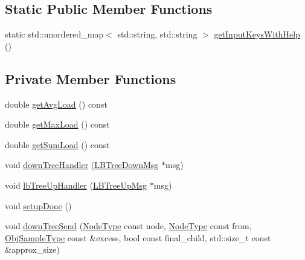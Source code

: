 \subsection*{Static Public Member Functions}
\begin{DoxyCompactItemize}
\item 
static std\+::unordered\+\_\+map$<$ std\+::string, std\+::string $>$ \hyperlink{structvt_1_1vrt_1_1collection_1_1lb_1_1_hierarchical_l_b_a3d0967de5be48bdb9ca86178b6b2a2d1}{get\+Input\+Keys\+With\+Help} ()
\end{DoxyCompactItemize}
\subsection*{Private Member Functions}
\begin{DoxyCompactItemize}
\item 
double \hyperlink{structvt_1_1vrt_1_1collection_1_1lb_1_1_hierarchical_l_b_a2fced8b5bbeeef2c150e66146cc77961}{get\+Avg\+Load} () const
\item 
double \hyperlink{structvt_1_1vrt_1_1collection_1_1lb_1_1_hierarchical_l_b_a32428a4c65c820d846e398270578d986}{get\+Max\+Load} () const
\item 
double \hyperlink{structvt_1_1vrt_1_1collection_1_1lb_1_1_hierarchical_l_b_a4cdebd4215afd2cac890525c7901f4ad}{get\+Sum\+Load} () const
\item 
void \hyperlink{structvt_1_1vrt_1_1collection_1_1lb_1_1_hierarchical_l_b_aa5e027cba0dfc9a1c7bc710e9932647a}{down\+Tree\+Handler} (\hyperlink{structvt_1_1vrt_1_1collection_1_1lb_1_1_l_b_tree_down_msg}{L\+B\+Tree\+Down\+Msg} $\ast$msg)
\item 
void \hyperlink{structvt_1_1vrt_1_1collection_1_1lb_1_1_hierarchical_l_b_a3b67d27c10a6a7532c9c5d1a57ab722a}{lb\+Tree\+Up\+Handler} (\hyperlink{structvt_1_1vrt_1_1collection_1_1lb_1_1_l_b_tree_up_msg}{L\+B\+Tree\+Up\+Msg} $\ast$msg)
\item 
void \hyperlink{structvt_1_1vrt_1_1collection_1_1lb_1_1_hierarchical_l_b_a6429b145c767766560741d009f037189}{setup\+Done} ()
\item 
void \hyperlink{structvt_1_1vrt_1_1collection_1_1lb_1_1_hierarchical_l_b_aff832357cbb81dc17578c9f8876b7ecf}{down\+Tree\+Send} (\hyperlink{namespacevt_a866da9d0efc19c0a1ce79e9e492f47e2}{Node\+Type} const node, \hyperlink{namespacevt_a866da9d0efc19c0a1ce79e9e492f47e2}{Node\+Type} const from, \hyperlink{structvt_1_1vrt_1_1collection_1_1lb_1_1_load_sampler_base_l_b_a8d939a849ec0d6371c1c4d441ffb9b94}{Obj\+Sample\+Type} const \&excess, bool const final\+\_\+child, std\+::size\+\_\+t const \&approx\+\_\+size)

\end{DoxyCompactItemize}
